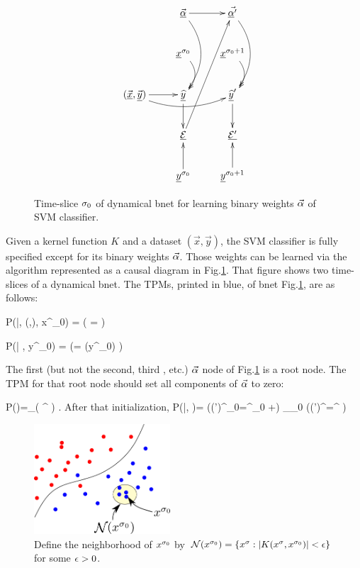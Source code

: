 \begin{figure}[h!]
$$
\xymatrix{
&\vec{\ul{\alp}}\ar@/^1.5pc/[dd]
\ar[r]
&\vec{\ul{\alp}'}\ar@/^1.5pc/[dd]
\\
&\rvx^{\s_0}\ar@/^1pc/[d]
&\rvx^{\s_0+1}\ar@/^1pc/[d]
\\
(\vec{\rvx}, \vec{\rvy})\ar[r]
\ar@/_1pc/[rr]
&\ul{\haty}\ar[d]
&\ul{\haty}'\ar[d]
\\
&\ul{\cale}\ar[ruuu]
&\ul{\cale'}
\\
&\rvy^{\s_0}\ar[u]
&\rvy^{\s_0+1}\ar[u]
}
$$
\caption{Time-slice $\sigma_0$ of dynamical bnet for
learning binary weights $\vec{\alpha}$ 
of SVM classifier.
}
\label{fig-svm-bnet}
\end{figure}

Given a kernel function $K$ and a dataset 
$(\vec{x}, \vec{y})$,
the SVM classifier is fully specified
except for its binary weights $\vec{\alpha}$.
Those weights can be learned via 
the algorithm
represented as a causal diagram  in Fig.\ref{fig-svm-bnet}.
That figure  shows two time-slices
of a dynamical bnet.
The TPMs, printed in blue,
of bnet Fig.\ref{fig-svm-bnet},
are as follows:



\beq\color{blue}
P(\haty|\vec{\alp}, (,), x^{\s_0})
=
\indi(\;\;\;
\haty= 
\;\;\;)
\eeq  

\beq\color{blue}
P(\cale| \haty, y^{\s_0})
=
\indi(\;\;\;\cale =
\indi(\haty\neq y^{\s_0})
\;\;\;)
\eeq  

The first (but not the second, third , etc.)
$\vec{\alpha}$ 
node of Fig.\ref{fig-svm-bnet}
is a root node.
The TPM for that root node
should set 
all components of $\vec{\alpha}$
to zero:

\beq\color{blue}
P(\vec{\alp})=\prod_\s \indi(\;\;\;
\alp^
\;\;\;)
\;.
\eeq
After that initialization,
\beq\color{blue}
P(|\vec{\alp}, \cale)=
\indi(\;\;\;(\alp')^{\s_0}=\alp^{\s_0} +\cale\;\;\;)\;\;
\prod_{\s\neq \s_0}
\indi(\;\;\;(\alp')^\s=\alp^\s
\;\;\;)
\eeq

\begin{figure}[h!]
\centering
\includegraphics[width=2in]
{svm/svm-why.png}
\caption{Define the neighborhood
of $x^{\sigma_0}$ by  ${\cal N}(x^{\sigma_0})
=
\{x^\sigma: |K(x^\sigma,  x^{\sigma_0})|<\epsilon \}$
for some $\epsilon>0$.}
\label{fig-svm-why}
\end{figure}

